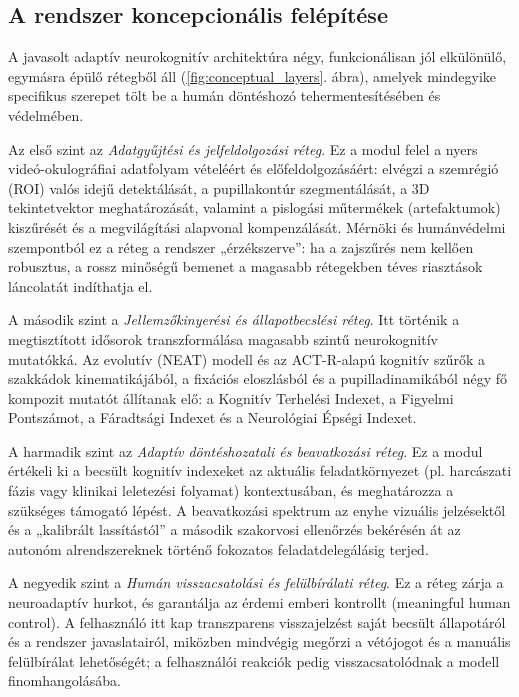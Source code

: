 \documentclass[12pt,a4paper,oneside]{book}
\begin{document}
\subsection{A rendszer koncepcionális felépítése}

A javasolt adaptív neurokognitív architektúra négy, funkcionálisan jól elkülönülő, egymásra épülő rétegből áll (\ref{fig:conceptual_layers}. ábra), amelyek mindegyike specifikus szerepet tölt be a humán döntéshozó tehermentesítésében és védelmében.

Az első szint az \emph{Adatgyűjtési és jelfeldolgozási réteg}. Ez a modul felel a nyers videó-okulográfiai adatfolyam vételéért és előfeldolgozásáért: elvégzi a szemrégió (ROI) valós idejű detektálását, a pupillakontúr szegmentálását, a 3D tekintetvektor meghatározását, valamint a pislogási műtermékek (artefaktumok) kiszűrését és a megvilágítási alapvonal kompenzálását. Mérnöki és humánvédelmi szempontból ez a réteg a rendszer „érzékszerve”: ha a zajszűrés nem kellően robusztus, a rossz minőségű bemenet a magasabb rétegekben téves riasztások láncolatát indíthatja el.

A második szint a \emph{Jellemzőkinyerési és állapotbecslési réteg}. Itt történik a megtisztított idősorok transzformálása magasabb szintű neurokognitív mutatókká. Az evolutív (NEAT) modell és az ACT-R-alapú kognitív szűrők a szakkádok kinematikájából, a fixációs eloszlásból és a pupilladinamikából négy fő kompozit mutatót állítanak elő: a Kognitív Terhelési Indexet, a Figyelmi Pontszámot, a Fáradtsági Indexet és a Neurológiai Épségi Indexet.

A harmadik szint az \emph{Adaptív döntéshozatali és beavatkozási réteg}. Ez a modul értékeli ki a becsült kognitív indexeket az aktuális feladatkörnyezet (pl. harcászati fázis vagy klinikai leletezési folyamat) kontextusában, és meghatározza a szükséges támogató lépést. A beavatkozási spektrum az enyhe vizuális jelzésektől és a „kalibrált lassítástól” a második szakorvosi ellenőrzés bekérésén át az autonóm alrendszereknek történő fokozatos feladatdelegálásig terjed.

A negyedik szint a \emph{Humán visszacsatolási és felülbírálati réteg}. Ez a réteg zárja a neuroadaptív hurkot, és garantálja az érdemi emberi kontrollt (meaningful human control). A felhasználó itt kap transzparens visszajelzést saját becsült állapotáról és a rendszer javaslatairól, miközben mindvégig megőrzi a vétójogot és a manuális felülbírálat lehetőségét; a felhasználói reakciók pedig visszacsatolódnak a modell finomhangolásába.
\end{document}
